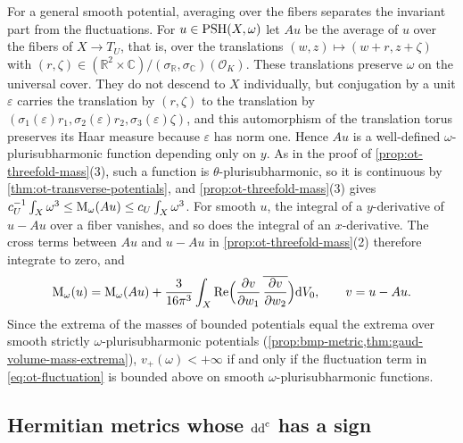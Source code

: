 For a general smooth potential, averaging over the fibers separates the invariant part from the fluctuations. For $u\in\mathrm{PSH}(X,\omega)$ let $Au$ be the average of $u$ over the fibers of $X\to T_U$, that is, over the translations $(w,z)\mapsto(w+r,z+\zeta)$ with $(r,\zeta)\in(\mathbb R^2\times\mathbb C)/(\sigma_{\mathbb R},\sigma_{\mathbb C})(\mathcal O_K)$. These translations preserve $\omega$ on the universal cover. They do not descend to $X$ individually, but conjugation by a unit $\varepsilon$ carries the translation by $(r,\zeta)$ to the translation by $(\sigma_1(\varepsilon)r_1,\sigma_2(\varepsilon)r_2,\sigma_3(\varepsilon)\zeta)$, and this automorphism of the translation torus preserves its Haar measure because $\varepsilon$ has norm one. Hence $Au$ is a well-defined $\omega$-plurisubharmonic function depending only on $y$. As in the proof of \cref{prop:ot-threefold-mass}(3), such a function is $\theta$-plurisubharmonic, so it is continuous by \cref{thm:ot-transverse-potentials}, and \cref{prop:ot-threefold-mass}(3) gives $c_U^{-1}\int_X\omega^3\leq\mathrm M_\omega(Au)\leq c_U\int_X\omega^3$. For smooth $u$, the integral of a $y$-derivative of $u-Au$ over a fiber vanishes, and so does the integral of an $x$-derivative. The cross terms between $Au$ and $u-Au$ in \cref{prop:ot-threefold-mass}(2) therefore integrate to zero, and
\begin{equation}\label{eq:ot-fluctuation}
 \mathrm M_\omega(u)=\mathrm M_\omega(Au)+\frac{3}{16\pi^3}\int_X
 \operatorname{Re}\Bigl(\frac{\partial v}{\partial w_1}\,
       \overline{\frac{\partial v}{\partial w_2}}\Bigr)\mathrm dV_0,
 \qquad v=u-Au.
\end{equation}
Since the extrema of the masses of bounded potentials equal the extrema over smooth strictly $\omega$-plurisubharmonic potentials (\cref{prop:bmp-metric,thm:gaud-volume-mass-extrema}), $v_+(\omega)<+\infty$ if and only if the fluctuation term in \eqref{eq:ot-fluctuation} is bounded above on smooth $\omega$-plurisubharmonic functions.

\subsection{Hermitian metrics whose $\mathrm{dd}^{\mathrm{c}}$ has a sign}

